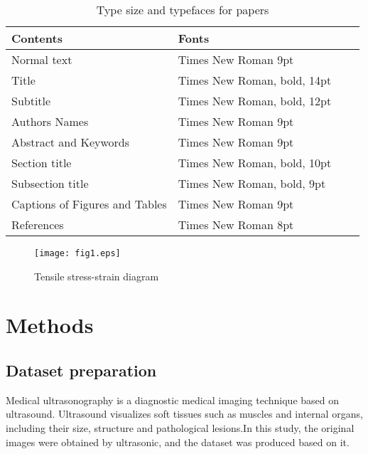 \documentclass[a4paper]{article}
\begin{document}
\begin{table}[tb]
 \caption{Type size and typefaces for papers}
 \label{tbl: table1}
 \centering
 \footnotesize
 \begin{tabular}{|p{35mm}|l|l|l|}
  \hline
	Contents	&Fonts \\\hline
	Normal text	&Times New Roman 9pt \\\hline
	Title	&Times New Roman, bold, 14pt \\\hline
	Subtitle	&Times New Roman, bold, 12pt \\\hline
	Authors Names	&Times New Roman 9pt \\\hline
	Abstract and Keywords	&Times New Roman 9pt \\\hline
	Section title		&Times New Roman, bold, 10pt \\\hline
	Subsection title		&Times New Roman, bold, 9pt \\\hline
	Captions of Figures and Tables	 &Times New Roman 9pt \\\hline
	References		&Times New Roman 8pt \\
  \hline
 \end{tabular}
\end{table}

\begin{figure}[tbh]
 \centering
  \texttt{[image: fig1.eps]}
  \vspace*{-4mm}
  \caption{Tensile stress-strain diagram}
  \label{fig: fig1}
\end{figure}
\fi

\section{Methods %
}

\subsection{Dataset preparation %
}%

Medical ultrasonography is a diagnostic medical imaging technique based on ultrasound. Ultrasound visualizes soft tissues such as muscles and internal organs, including their size, structure and pathological lesions.In this study, the original images were obtained by ultrasonic, and the dataset was produced based on it.
\end{document}
